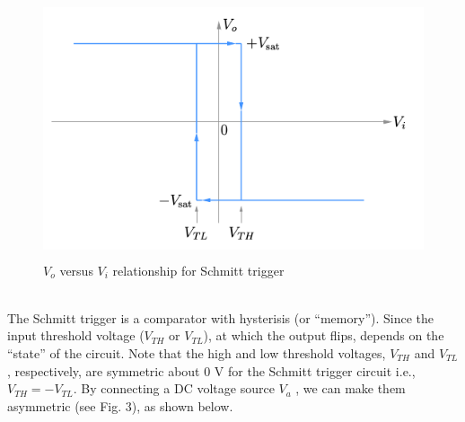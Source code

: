 \documentclass[12pt]{article}
\begin{document}
      \begin{figure}[H]
            \centering
            \includegraphics[width = 0.7\linewidth, height = 3in]{reports/lab2/scmiii.png}
            \caption{$V_o$ versus $V_i$ relationship for Schmitt trigger}
        \end{figure}
        \\
        The Schmitt trigger is a comparator with hysterisis (or “memory”). Since the input threshold voltage ($V_{TH}$ or $V_{TL}$), at which the output flips, depends on the “state” of the circuit.
        Note that the high and low threshold voltages, $V_{TH}$ and $V_{TL}$, respectively, are symmetric about 0 V for the Schmitt trigger circuit i.e., $V_{TH} = −V_{TL}$. By connecting a DC voltage source $V_a$ , we can make them asymmetric (see Fig. 3), as shown below.
\end{document}
